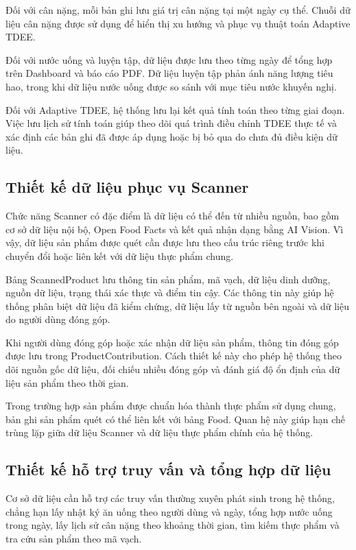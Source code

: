 \documentclass[12pt, a4paper]{report}
\begin{document}
Đối với cân nặng, mỗi bản ghi lưu giá trị cân nặng tại một ngày cụ thể. Chuỗi dữ liệu cân nặng được sử dụng để hiển thị xu hướng và phục vụ thuật toán Adaptive TDEE.

Đối với nước uống và luyện tập, dữ liệu được lưu theo từng ngày để tổng hợp trên Dashboard và báo cáo PDF. Dữ liệu luyện tập phản ánh năng lượng tiêu hao, trong khi dữ liệu nước uống được so sánh với mục tiêu nước khuyến nghị.

Đối với Adaptive TDEE, hệ thống lưu lại kết quả tính toán theo từng giai đoạn. Việc lưu lịch sử tính toán giúp theo dõi quá trình điều chỉnh TDEE thực tế và xác định các bản ghi đã được áp dụng hoặc bị bỏ qua do chưa đủ điều kiện dữ liệu.

\subsection{Thiết kế dữ liệu phục vụ Scanner}Chức năng Scanner có đặc điểm là dữ liệu có thể đến từ nhiều nguồn, bao gồm cơ sở dữ liệu nội bộ, Open Food Facts và kết quả nhận dạng bằng AI Vision. Vì vậy, dữ liệu sản phẩm được quét cần được lưu theo cấu trúc riêng trước khi chuyển đổi hoặc liên kết với dữ liệu thực phẩm chung.

Bảng ScannedProduct lưu thông tin sản phẩm, mã vạch, dữ liệu dinh dưỡng, nguồn dữ liệu, trạng thái xác thực và điểm tin cậy. Các thông tin này giúp hệ thống phân biệt dữ liệu đã kiểm chứng, dữ liệu lấy từ nguồn bên ngoài và dữ liệu do người dùng đóng góp.

Khi người dùng đóng góp hoặc xác nhận dữ liệu sản phẩm, thông tin đóng góp được lưu trong ProductContribution. Cách thiết kế này cho phép hệ thống theo dõi nguồn gốc dữ liệu, đối chiếu nhiều đóng góp và đánh giá độ ổn định của dữ liệu sản phẩm theo thời gian.

Trong trường hợp sản phẩm được chuẩn hóa thành thực phẩm sử dụng chung, bản ghi sản phẩm quét có thể liên kết với bảng Food. Quan hệ này giúp hạn chế trùng lặp giữa dữ liệu Scanner và dữ liệu thực phẩm chính của hệ thống.

\subsection{Thiết kế hỗ trợ truy vấn và tổng hợp dữ liệu}Cơ sở dữ liệu cần hỗ trợ các truy vấn thường xuyên phát sinh trong hệ thống, chẳng hạn lấy nhật ký ăn uống theo người dùng và ngày, tổng hợp nước uống trong ngày, lấy lịch sử cân nặng theo khoảng thời gian, tìm kiếm thực phẩm và tra cứu sản phẩm theo mã vạch.
\end{document}
